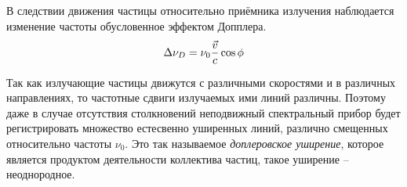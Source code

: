 В следствии движения частицы относительно приёмника излучения наблюдается 
изменение частоты обусловенное эффектом Допплера.
\[
  \Delta\nu_D = \nu_0 \frac{\vec{v}}{c}\cos\phi
\]

Так как излучающие частицы движутся с различными скоростями и в различных 
направлениях, то частотные сдвиги излучаемых ими линий различны. Поэтому даже 
в случае отсутствия столкновений неподвижный спектральный прибор будет 
регистрировать множество естесвенно уширенных линий, различно смещенных 
относительно частоты \( \nu_0 \). Это так называемое \emph{доплеровское 
уширение}, которое является продуктом деятельности коллектива частиц, такое 
уширение -- неоднородное.